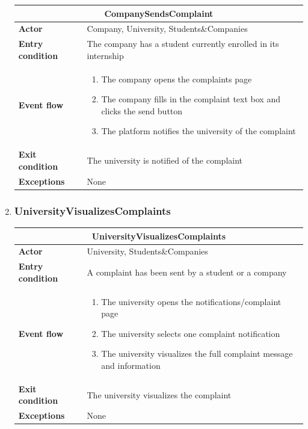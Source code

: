 \begin{enumerate}[label=\textbf{UC\arabic* -}]
\begin{table}[H]
    \centering
    \begin{tabular}{|l|m{10cm}|}
        \hline \multicolumn{2}{|c|}{\textbf{CompanySendsComplaint}} \\
        \hline \textbf{Actor} & Company, University, Students\&Companies \\
        \hline \textbf{Entry condition} & The company has a student currently enrolled in its internship \\
        \hline \textbf{Event flow} &
            \begin{enumerate}[label=\arabic*]
                \item The company opens the complaints page
                \item The company fills in the complaint text box and clicks the send button
                \item The platform notifies the university of the complaint
            \end{enumerate} \\
        \hline \textbf{Exit condition} & The university is notified of the complaint \\
        \hline \textbf{Exceptions} & None \\
        \hline
    \end{tabular}
\end{table}

\item \subsubsection{UniversityVisualizesComplaints}

\begin{table}[H]
    \centering
    \begin{tabular}{|l|m{10cm}|}
        \hline \multicolumn{2}{|c|}{\textbf{UniversityVisualizesComplaints}} \\
        \hline \textbf{Actor} & University, Students\&Companies \\
        \hline \textbf{Entry condition} & A complaint has been sent by a student or a company \\
        \hline \textbf{Event flow} &
            \begin{enumerate}[label=\arabic*]
                \item The university opens the notifications/complaint page
                \item The university selects one complaint notification
                \item The university visualizes the full complaint message and information
            \end{enumerate} \\
        \hline \textbf{Exit condition} & The university visualizes the complaint \\
        \hline \textbf{Exceptions} & None \\
        \hline
    \end{tabular}
\end{table}


\end{enumerate}
